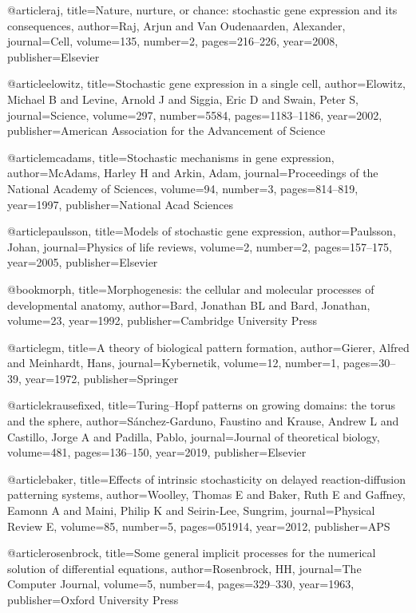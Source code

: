 @article{raj,
  title={Nature, nurture, or chance: stochastic gene expression and its consequences},
  author={Raj, Arjun and Van Oudenaarden, Alexander},
  journal={Cell},
  volume={135},
  number={2},
  pages={216--226},
  year={2008},
  publisher={Elsevier}
}

@article{elowitz,
  title={Stochastic gene expression in a single cell},
  author={Elowitz, Michael B and Levine, Arnold J and Siggia, Eric D and Swain, Peter S},
  journal={Science},
  volume={297},
  number={5584},
  pages={1183--1186},
  year={2002},
  publisher={American Association for the Advancement of Science}
}

@article{mcadams,
  title={Stochastic mechanisms in gene expression},
  author={McAdams, Harley H and Arkin, Adam},
  journal={Proceedings of the National Academy of Sciences},
  volume={94},
  number={3},
  pages={814--819},
  year={1997},
  publisher={National Acad Sciences}
}

@article{paulsson,
  title={Models of stochastic gene expression},
  author={Paulsson, Johan},
  journal={Physics of life reviews},
  volume={2},
  number={2},
  pages={157--175},
  year={2005},
  publisher={Elsevier}
}


@book{morph,
  title={Morphogenesis: the cellular and molecular processes of developmental anatomy},
  author={Bard, Jonathan BL and Bard, Jonathan},
  volume={23},
  year={1992},
  publisher={Cambridge University Press}
}

@article{gm,
  title={A theory of biological pattern formation},
  author={Gierer, Alfred and Meinhardt, Hans},
  journal={Kybernetik},
  volume={12},
  number={1},
  pages={30--39},
  year={1972},
  publisher={Springer}
}


@article{krausefixed,
  title={Turing--Hopf patterns on growing domains: the torus and the sphere},
  author={S{\'a}nchez-Garduno, Faustino and Krause, Andrew L and Castillo, Jorge A and Padilla, Pablo},
  journal={Journal of theoretical biology},
  volume={481},
  pages={136--150},
  year={2019},
  publisher={Elsevier}
}


@article{baker,
  title={Effects of intrinsic stochasticity on delayed reaction-diffusion patterning systems},
  author={Woolley, Thomas E and Baker, Ruth E and Gaffney, Eamonn A and Maini, Philip K and Seirin-Lee, Sungrim},
  journal={Physical Review E},
  volume={85},
  number={5},
  pages={051914},
  year={2012},
  publisher={APS}
}

@article{rosenbrock,
  title={Some general implicit processes for the numerical solution of differential equations},
  author={Rosenbrock, HH},
  journal={The Computer Journal},
  volume={5},
  number={4},
  pages={329--330},
  year={1963},
  publisher={Oxford University Press}
}


